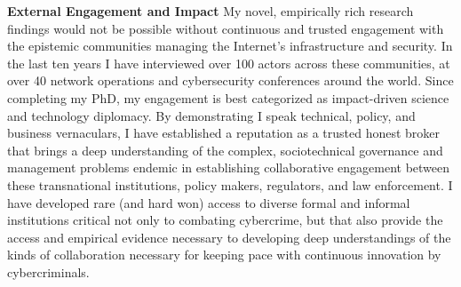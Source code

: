 \documentclass[11pt]{letter}
\begin{document}
\begin{letter}
\textbf{External Engagement and Impact} \vspace{0.2 \baselineskip} \newline %
%
My novel, empirically rich research findings would not be possible without continuous and trusted engagement with the epistemic communities managing the Internet's infrastructure and security.
%
In the last ten years I have interviewed over 100 actors across these communities, at over 40 network operations and cybersecurity conferences around the world.
%
%
%
%
Since completing my PhD, my engagement is best categorized as impact-driven science and technology diplomacy.
%
By demonstrating I speak technical, policy, and business vernaculars, I have established a reputation as a trusted honest broker that brings a deep understanding of the complex, sociotechnical governance and management problems endemic in establishing collaborative engagement between these transnational institutions, policy makers, regulators, and law enforcement.
%
I have developed rare (and hard won) access to diverse formal and informal institutions critical not only to combating cybercrime, but that also provide the access and empirical evidence necessary to developing deep understandings of the kinds of collaboration necessary for keeping pace with continuous innovation by cybercriminals.
%



\end{letter}
\end{document}
